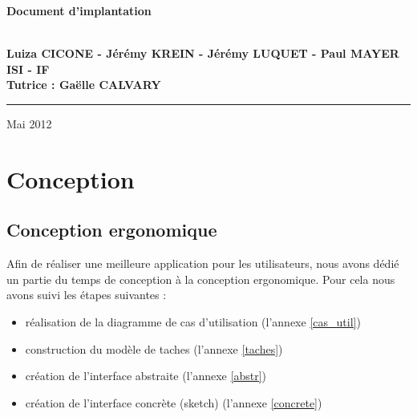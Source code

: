 \documentclass[a4paper, 11pt]{article}
\begin{document}
\begin{titlepage}
\begin{center}
\begin{center}
{\Huge \bf Document d'implantation}


\end{center}


\vspace{1cm}

\begin{center}
$ $\\
\large{ \textbf{Luiza CICONE - Jérémy KREIN - Jérémy LUQUET - Paul MAYER}}\\
\large{ \textbf{ISI - IF}}\\
\large{ \textbf{Tutrice : Gaëlle CALVARY}}
$ $\\
\end{center}
\rule{\linewidth}{.5pt}


\vfill


{\large Mai 2012}

\end{center}
\end{titlepage}

\tableofcontents

\newpage

\section {Conception}
\subsection{Conception ergonomique}

Afin de réaliser une meilleure application pour les utilisateurs, nous avons dédié un partie du temps de conception à la conception ergonomique. Pour cela nous avons suivi les étapes suivantes :\\
\begin {itemize}

\item réalisation de la diagramme de cas d'utilisation (l'annexe \ref{cas_util})\\
\item construction du modèle de taches (l'annexe \ref{taches})\\
\item création de l'interface abstraite (l'annexe \ref{abstr})\\
\item création de l'interface concrète (sketch) (l'annexe \ref{concrete})\\
\end{itemize}
\end{document}
